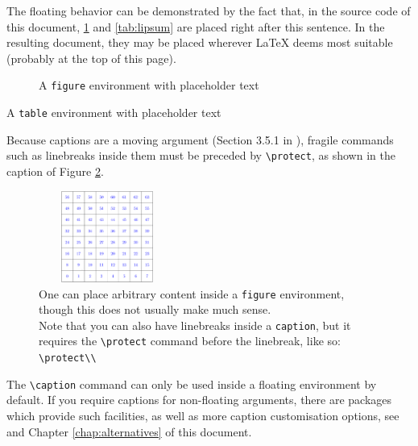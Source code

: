 \documentclass[article,a4paper,oneside,10pt]{memoir}
\newcommand\code[1]{\texttt{#1}}
\begin{document}
The floating behavior can be demonstrated by the fact that, in the source code
of this document, \ref{fig:lipsum} and \ref{tab:lipsum} are placed right after
this sentence. In the resulting document, they may be placed wherever \LaTeX{}
deems most suitable (probably at the top of this page\footnotemark).


\begin{figure}
    \small\lipsum[2]
    \caption{A \texttt{figure} environment with placeholder text}
    \label{fig:lipsum}
\end{figure}

\begin{table}
    \caption{A \texttt{table} environment with placeholder text}
    \label{tab:lipsum}
    \small\lipsum[2]
\end{table}

Because  captions are  a moving  argument (Section  3.5.1 in  \cite{lamport}),
fragile  commands  such  as  linebreaks   inside  them  must  be  preceded  by
\verb|\protect|, as shown in the caption of Figure \ref{fig:protect}.

\begin{figure}
    \centering
    \includegraphics[height=3cm,width=4.5cm]{images/grid8cm.png}
    \caption[Linebreaks in Captions]{%
        One can  place arbitrary  content inside a  \code{figure} environment,
        though this does not usually make much sense.\protect\\
        Note      that       you      can      also       have      linebreaks
        inside     a      \code{caption},     but     it      requires     the
        \code{\textbackslash{}protect} command before  the linebreak, like so:
        \code{\textbackslash{}protect\textbackslash\textbackslash}}
    \label{fig:protect}
\end{figure}

The \verb|\caption| command can only be  used inside a floating environment by
default.   If  you require  captions  for  non-floating arguments,  there  are
packages which provide such facilities,  as well as more caption customisation
options,   see   \cite{ctan:package:caption,ctan:topic:caption}  and   Chapter
\ref{chap:alternatives} of this document.
\end{document}
